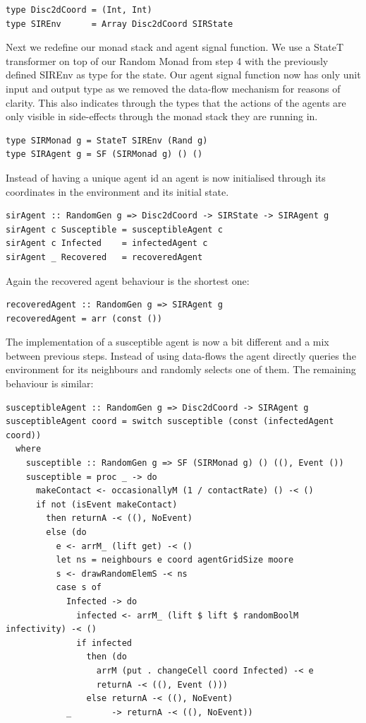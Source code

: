 \begin{verbatim}
type Disc2dCoord = (Int, Int)
type SIREnv      = Array Disc2dCoord SIRState
\end{verbatim}

Next we redefine our monad stack and agent signal function. We use a StateT transformer on top of our Random Monad from step 4 with the previously defined SIREnv as type for the state. Our agent signal function now has only unit input and output type as we removed the data-flow mechanism for reasons of clarity. This also indicates through the types that the actions of the agents are only visible in side-effects through the monad stack they are running in.

\begin{verbatim}
type SIRMonad g = StateT SIREnv (Rand g)
type SIRAgent g = SF (SIRMonad g) () ()
\end{verbatim}

Instead of having a unique agent id an agent is now initialised through its coordinates in the environment and its initial state. 

\begin{verbatim}
sirAgent :: RandomGen g => Disc2dCoord -> SIRState -> SIRAgent g
sirAgent c Susceptible = susceptibleAgent c
sirAgent c Infected    = infectedAgent c
sirAgent _ Recovered   = recoveredAgent
\end{verbatim}

Again the recovered agent behaviour is the shortest one:
\begin{verbatim}
recoveredAgent :: RandomGen g => SIRAgent g
recoveredAgent = arr (const ())
\end{verbatim}

The implementation of a susceptible agent is now a bit different and a mix between previous steps. Instead of using data-flows the agent directly queries the environment for its neighbours and randomly selects one of them. The remaining behaviour is similar:

\begin{verbatim}
susceptibleAgent :: RandomGen g => Disc2dCoord -> SIRAgent g
susceptibleAgent coord = switch susceptible (const (infectedAgent coord))
  where
    susceptible :: RandomGen g => SF (SIRMonad g) () ((), Event ())
    susceptible = proc _ -> do
      makeContact <- occasionallyM (1 / contactRate) () -< ()
      if not (isEvent makeContact)
        then returnA -< ((), NoEvent)
        else (do
          e <- arrM_ (lift get) -< ()
          let ns = neighbours e coord agentGridSize moore
          s <- drawRandomElemS -< ns
          case s of
            Infected -> do
              infected <- arrM_ (lift $ lift $ randomBoolM infectivity) -< ()
              if infected 
                then (do
                  arrM (put . changeCell coord Infected) -< e
                  returnA -< ((), Event ()))
                else returnA -< ((), NoEvent)
            _        -> returnA -< ((), NoEvent))

\end{verbatim}

